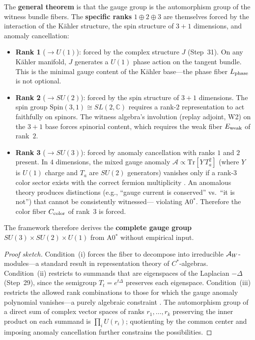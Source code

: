 \begin{theorem}
The \textbf{general theorem} is that the gauge group is the automorphism
group of the witness bundle fibers.  The \textbf{specific ranks}
$1 \oplus 2 \oplus 3$ are themselves forced by the interaction of the
K\"{a}hler structure, the spin structure of $3{+}1$ dimensions, and
anomaly cancellation:
\begin{itemize}[nosep]
  \item \textbf{Rank 1} ($\to U(1)$): forced by the complex structure $J$
        (Step~31).  On any K\"{a}hler manifold, $J$ generates a $U(1)$
        phase action on the tangent bundle.  This is the minimal gauge
        content of the K\"{a}hler base---the phase fiber $L_{\mathrm{phase}}$ is not
        optional.
  \item \textbf{Rank 2} ($\to SU(2)$): forced by the spin structure of
        $3{+}1$ dimensions.  The spin group $\mathrm{Spin}(3,1) \cong
        SL(2,\mathbb{C})$ requires a rank-$2$ representation to act
        faithfully on spinors.  The witness algebra's involution (replay
        adjoint, W2) on the $3{+}1$ base forces spinorial content, which
        requires the weak fiber $E_{\mathrm{weak}}$ of rank~$2$.
  \item \textbf{Rank 3} ($\to SU(3)$): forced by anomaly cancellation
        with ranks $1$ and $2$ present.  In $4$ dimensions, the mixed
        gauge anomaly $\mathcal{A} \propto \mathrm{Tr}[Y \, T_a^2]$
        (where $Y$ is $U(1)$ charge and $T_a$ are $SU(2)$ generators)
        vanishes only if a rank-$3$ color sector exists with the correct
        fermion multiplicity \citep{adler1969,bell1969}.  An anomalous
        theory produces distinctions (e.g., ``gauge current is conserved''
        vs.\ ``it is not'') that cannot be consistently witnessed---
        violating A0$^*$.  Therefore the color fiber $C_{\mathrm{color}}$ of rank~$3$
        is forced.
\end{itemize}
The framework therefore derives the \textbf{complete gauge group}
$SU(3) \times SU(2) \times U(1)$ from A0$^*$ without empirical input.
\begin{proof}[Proof sketch]
Condition~(i) forces the fiber to decompose into irreducible
$\mathcal{A}_W$-modules---a standard result in representation theory of
$C^*$-algebras.  Condition~(ii) restricts to summands that are
eigenspaces of the Laplacian $-\Delta$ (Step~29), since the semigroup
$T_t = e^{t\Delta}$ preserves each eigenspace.  Condition~(iii)
restricts the allowed rank combinations to those for which the gauge
anomaly polynomial vanishes---a purely algebraic constraint
\citep{adler1969,bell1969}.  The automorphism group of a direct sum of
complex vector spaces of ranks $r_1, \ldots, r_k$ preserving the inner
product on each summand is $\prod_i U(r_i)$; quotienting by the
common center and imposing anomaly cancellation further constrains the
possibilities.


\end{proof}
\end{theorem}
